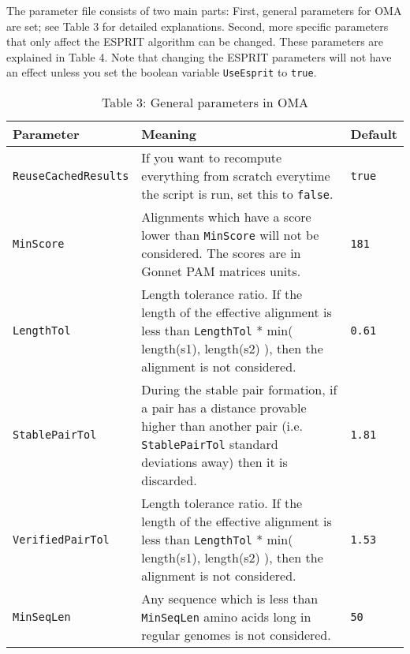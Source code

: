 \documentclass{scrartcl}
\begin{document}
\noindent The parameter file consists of two main parts:
                First, general parameters for OMA are set; see Table 3 for
                detailed explanations. Second, more specific parameters 
                that only affect the ESPRIT algorithm can be changed. 
                These parameters are explained in Table 4.
                Note that changing the ESPRIT parameters
                will not have an effect unless you set the boolean variable \texttt{UseEsprit} to \texttt{true}.
\begin{table}[!ht]
\begin{tabular}{ l p{9cm} p{2cm} }
\textbf{Parameter} & \textbf{Meaning} & \textbf{Default}\\
\hline
\texttt{ReuseCachedResults} & 
\noindent If you want to recompute everything from
                        scratch everytime the script is run, set this to \texttt{false}.
 & \texttt{true}\\
\texttt{MinScore} & 
\noindent Alignments which have a score lower than \texttt{MinScore} will not be considered. The scores
                        are in Gonnet PAM matrices units.
 & \texttt{181}\\
\texttt{LengthTol} & 
\noindent Length tolerance ratio. If the length of
                        the effective alignment is less than \texttt{LengthTol} * min( length(s1), length(s2) ), then 
                        the alignment is not considered.
 & \texttt{0.61}\\
\texttt{StablePairTol} & 
\noindent During the stable pair formation, if a
                        pair has a distance provable higher than another pair
                        (i.e. \texttt{StablePairTol} standard deviations
                        away) then it is discarded.
 & \texttt{1.81}\\
\texttt{VerifiedPairTol} & 
\noindent Length tolerance ratio. If the length of
                        the effective alignment is less than \texttt{LengthTol} * min( length(s1), length(s2) ), then the alignment is
                        not considered.
 & \texttt{1.53}\\
\texttt{MinSeqLen} & 
\noindent Any sequence which is less than \texttt{MinSeqLen} amino acids long in regular genomes
                        is not considered.
 & \texttt{50}\\
\end{tabular}
\caption{Table 3: General parameters in OMA}
\end{table}
\end{document}
